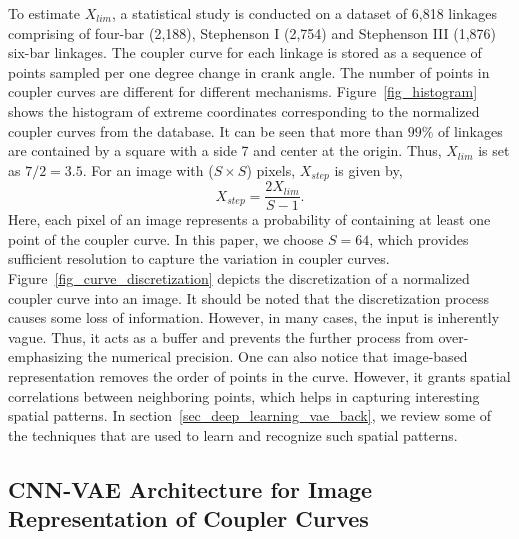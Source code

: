 To estimate $X_{lim}$, a statistical study is conducted on a dataset of 6,818 linkages comprising of four-bar (2,188), Stephenson I (2,754) and Stephenson III (1,876) six-bar linkages. The coupler curve for each linkage is stored as a sequence of points sampled per one degree change in crank angle. The number of points in coupler curves are different for different mechanisms. Figure~\ref{fig_histogram} shows the histogram of extreme coordinates corresponding to the normalized coupler curves from the database. It can be seen that more than $99\%$ of linkages are contained by a square with a side 7 and center at the origin. Thus, $X_{lim}$ is set as $7/2 = 3.5$. 
For an image with ($S\times S$) pixels, $X_{step}$ is given by,
\begin{equation*}
   X_{step} = \frac{2X_{lim}}{S - 1}.
\end{equation*}
Here, each pixel of an image represents a probability of containing at least one point of the coupler curve.
In this paper, we choose $S = 64$, which provides sufficient resolution to capture the variation in coupler curves. 
Figure~\ref{fig_curve_discretization} depicts the discretization of a normalized coupler curve into an image.
It should be noted that the discretization process causes some loss of information. However, in many cases, the input is inherently vague. Thus, it acts as a buffer and prevents the further process from over-emphasizing the numerical precision. One can also notice that image-based representation removes the order of points in the curve. However, it grants spatial correlations between neighboring points, which helps in capturing interesting spatial patterns. In section~\ref{sec_deep_learning_vae_back}, we review some of the techniques that are used to learn and recognize such spatial patterns.



\subsection{CNN-VAE Architecture for Image Representation of Coupler Curves}

